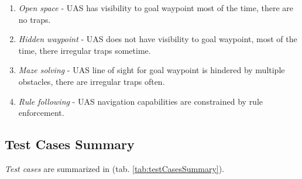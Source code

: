 \begin{enumerate}
    \item \emph{Open space} - UAS has visibility to goal waypoint most of the time, there are no traps.
    \item \emph{Hidden waypoint} - UAS does not have visibility to goal waypoint, most of the time, there irregular traps sometime.
    \item \emph{Maze solving} - UAS line of sight for goal waypoint is hindered by multiple obstacles, there are irregular traps often.
    \item \emph{Rule following} - UAS navigation capabilities are constrained by rule enforcement.
\end{enumerate}

\newpage
\subsection{Test Cases Summary}\label{s:testCaseSummary}

\noindent \emph{Test cases} are summarized in (tab. \ref{tab:testCasesSummary}).

